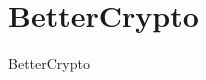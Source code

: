 \documentclass{beamer}
\begin{document}
\pagestyle{empty}
 \frame{
    \titlepage
}


\section{BetterCrypto}
\begin{frame}{BetterCrypto}
\end{frame}
\end{document}
